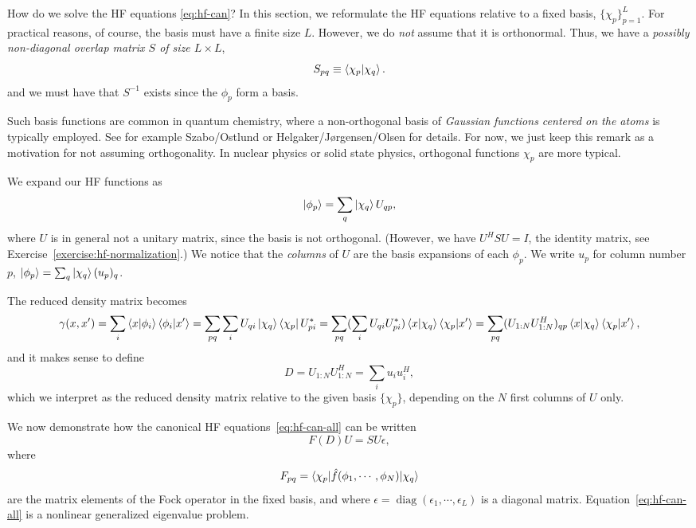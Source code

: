 \documentclass{report}
\theoremstyle{plain}
\theoremstyle{definition}
\begin{document}
How do we solve the HF equations \eqref{eq:hf-can}? In this section,
we reformulate the HF equations relative to a fixed basis,
$\{\chi_p\}_{p=1}^L$. For practical reasons, of course, the basis must
have a finite size $L$. However, we do \emph{not} assume that it is
orthonormal. Thus, we have a \emph{possibly non-diagonal overlap
  matrix $S$ of size $L\times L$},
\begin{equation}
  S_{pq} \equiv \braket{\chi_p|\chi_q}.
\end{equation}
and we must have that $S^{-1}$ exists since the $\phi_p$ form a basis.

Such basis functions are common in quantum chemistry, where a
non-orthogonal basis of \emph{Gaussian functions centered on the
  atoms} is typically employed. See for example Szabo/Ostlund or
Helgaker/J{\o}rgensen/Olsen for details. For now, we just keep this
remark as a motivation for not assuming orthogonality. In nuclear
physics or solid state physics, orthogonal functions $\chi_p$ are more
typical.

We expand our HF functions as
\begin{equation}
  \ket{\phi_p} = \sum_q  \ket{\chi_q} U_{qp} ,
\end{equation}
where $U$ is in general not a unitary matrix, since the basis is not
orthogonal. (However, we have $U^HSU = I$, the identity matrix, see
Exercise~\ref{exercise:hf-normalization}.)  We notice that the \emph{columns} of $U$ are
the basis expansions of each $\phi_p$.  We write $u_p$ for column
number $p$, $\ket{\phi_p}=\sum_q \ket{\chi_q} (u_p)_q$.

The reduced density matrix becomes
\begin{equation}
  \gamma(x,x') = \sum_i \braket{x|\phi_i}\braket{\phi_i|x'} = \sum_{pq}\sum_i
  {U}_{qi}\ket{\chi_q}\bra{\chi_{p}} {U}_{pi}^* =
  \sum_{pq} (\sum_i U_{qi} U_{pi}^*) \braket{x|\chi_q}\braket{\chi_p|x'} =
  \sum_{pq} (U_{1:N}U_{1:N}^H)_{qp} \braket{x|\chi_q}\braket{\chi_p|x'},
\end{equation}
and it makes sense to define
\begin{equation}
  D = U_{1:N} U_{1:N}^H = \sum_i u_i u_i^H,
\end{equation}
which we interpret as the reduced density matrix relative to the given basis
$\{\chi_p\}$, depending on the $N$ first columns of ${U}$
only.

We now demonstrate how the canonical HF
equations~\eqref{eq:hf-can-all} can be written
\begin{equation}
  F(D) U = S U \epsilon, \label{eq:hf-can-matrix}
\end{equation}
where
\begin{equation}
  F_{pq} = \braket{\chi_p|\hat{f}(\phi_1,\cdots,\phi_N)|\chi_q}
\end{equation}
are the matrix elements of the Fock operator in the fixed basis, and
where $\epsilon = \operatorname{diag}(\epsilon_1,\cdots,\epsilon_L)$
is a diagonal matrix. Equation~\eqref{eq:hf-can-all} is a nonlinear
generalized eigenvalue problem.
\end{document}
